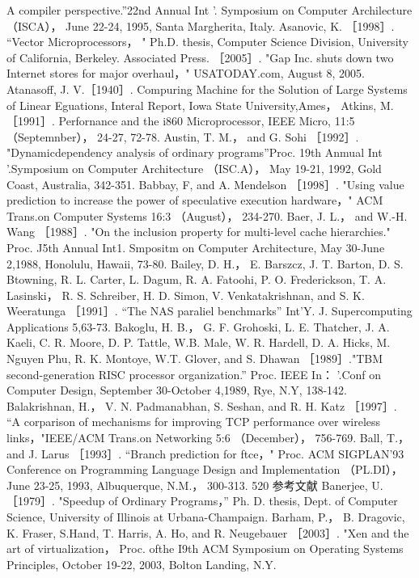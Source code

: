 A compiler perspective.”22nd Annual Int '. Symposium on Computer Archilecture （ISCA）， June 22-24, 1995, Santa
Margherita, Italy.
Asanovic, K. ［1998］. “Vector Microprocessors， " Ph.D. thesis, Computer Science Division, University of California, Berkeley.
Associated Press. ［2005］. "Gap Inc. shuts down two Internet stores for major overhaul，" USATODAY.com, August 8, 2005.
Atanasoff, J. V.［1940］. Compuring Machine for the Solution of Large Systems of Linear Eguations, Interal Report, Iowa State
University,Ames，
Atkins, M.［1991］. Perfornance and the i860 Microprocessor, IEEE Micro, 11:5 （Septemnber）， 24-27, 72-78.
Austin, T. M.， and G. Sohi ［1992］. "Dynamicdependency analysis of ordinary programs”Proc. 19th Anmual Int '.Symposium on
Computer Architecture （ISC.A）， May 19-21, 1992, Gold Coast, Australia, 342-351.
Babbay, F, and A. Mendelson ［1998］. "Using value prediction to increase the power of speculative execution hardware，" ACM
Trans.on Computer Systems 16:3 （August）， 234-270.
Baer, J. L.， and W.-H. Wang ［1988］. "On the inclusion property for multi-level cache hierarchies." Proc. J5th Annual Int1.
Smpositm on Computer Architecture, May 30-June 2,1988, Honolulu, Hawaii, 73-80.
Bailey, D. H.， E. Barszcz, J. T. Barton, D. S. Btowning, R. L. Carter, L. Dagum, R. A. Fatoohi, P. O. Frederickson, T. A. Lasinski，
R. S. Schreiber, H. D. Simon, V. Venkatakrishnan, and S. K. Weeratunga ［1991］. “The NAS paraliel benchmarks” Int'Y. J.
Supercomputing Applications 5,63-73.
Bakoglu, H. B.， G. F. Grohoski, L. E. Thatcher, J. A. Kaeli, C. R. Moore, D. P. Tattle, W.B. Male, W. R. Hardell, D. A. Hicks, M.
Nguyen Phu, R. K. Montoye, W.T. Glover, and S. Dhawan ［1989］."TBM second-generation RISC processor organization.”
Proc. IEEE In： '.Conf on Computer Design, September 30-October 4,1989, Rye, N.Y, 138-142.
Balakrishnan, H.， V. N. Padmanabhan, S. Seshan, and R. H. Katz ［1997］. “A corparison of mechanisms for improving TCP
performance over wireless links，"IEEE/ACM Trans.on Networking 5:6 （December）， 756-769.
Ball, T.， and J. Larus ［1993］. “Branch prediction for ftce，" Proc. ACM SIGPLAN'93 Conference on Programming Language
Design and Implementation （PL.DI）， June 23-25, 1993, Albuquerque, N.M.， 300-313.
520
参考文献
Banerjee, U. ［1979］. "Speedup of Ordinary Programs，” Ph. D. thesis, Dept. of Computer Science, University of Illinois at
Urbana-Champaign.
Barham, P.， B. Dragovic, K. Fraser, S.Hand, T. Harris, A. Ho, and R. Neugebauer ［2003］. "Xen and the art of virtualization，
Proc. ofthe I9th ACM Symposium on Operating Systems Principles, October 19-22, 2003, Bolton Landing, N.Y.
